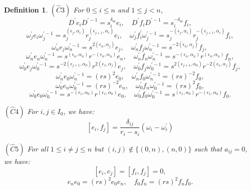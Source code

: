 \documentclass[10pt,a4paper]{amsart}
\newtheorem{defi}[theorem]{Definition}
\numberwithin{equation}{section}
\begin{document}
\begin{defi}
		$(\hat{C} 3)$ For $0 \leqslant i \leqslant n$ and $1 \leqslant j<n$,
			$$
		D^{\prime} e_i D^{\prime-1}=s_i^{\delta_{0 i}} e_i, \quad D^{\prime} f_i D^{\prime-1}=s_i^{-\delta_{0 i}} f_i,
		$$
		$$
		\omega_j^{\prime} e_i \omega_j^{\prime-1}=s_j^{\left(\epsilon_j, \alpha_i\right)} r_j^{\left(\epsilon_{j+1}, \alpha_i\right)} e_i, \quad \omega_j^{\prime} f_i^{\prime} \omega_j^{\prime-1}=s_j^{-\left(\epsilon_j, \alpha_i\right)} r_j^{-\left(\epsilon_{j+1}, \alpha_i\right)} f_i,
		$$
		$$
		\omega_n^{\prime} e_j \omega_n^{\prime-1}=s^{2\left(\epsilon_n, \alpha_j\right)} e_j, \quad \omega_n^{\prime} f_j \omega_n^{\prime-1}=s^{-2\left(\epsilon_n, \alpha_j\right)} f_j \text {, }
		$$
		$$
		\omega_n^{\prime} e_n \omega_n^{\prime-1}=s^{\left(\epsilon_n, \alpha_n\right)} r^{-\left(\epsilon_n, \alpha_n\right)} e_n, \quad \omega_n^{\prime} f_n \omega_n^{\prime-1}=s^{-\left(\epsilon_n, \alpha_n\right)} r^{\left(\epsilon_n, \alpha_n\right)} f_n,
		$$
		$$
		\omega_0^{\prime} e_j \omega_0^{\prime-1}=s^{-2\left(\epsilon_{j+1}, \alpha_0\right)} r^{2\left(\epsilon_1, \alpha_j\right)} e_j, \quad \omega_0^{\prime} f_j \omega_0^{\prime-1}=s^{2\left(\epsilon_{j+1}, \alpha_0\right)} r^{-2\left(\epsilon_1, \alpha_j\right)} f_j,
		$$
		$$
		\omega_n^{\prime} e_0 \omega_n^{\prime-1}=(r s)^2 e_0, \quad \omega_n^{\prime} f_0 \omega_n^{\prime-1}=(r s)^{-2} f_0,
		$$
		$$
		\omega_0^{\prime} e_n \omega_0^{\prime-1}=(r s)^{-2} e_n, \quad \omega_0^{\prime} f_n \omega_0^{\prime-1}=(r s)^2 f_0,
		$$
		$$
		\omega_0^{\prime} e_0 \omega_0^{\prime-1}=s^{-\left(\epsilon_1, \alpha_0\right)} r^{\left(\epsilon_1, \alpha_0\right)} e_0, \quad \omega_0^{\prime} f_0 \omega_0^{\prime-1}=s^{\left(\epsilon_1, \alpha_0\right)} r^{-\left(\epsilon_1, \alpha_0\right)} f_0.
		$$	
		
		$(\hat{C} 4)$ For $i, j \in I_0$, we have:
		$$\left[e_i, f_j\right]=\frac{\delta_{i j}}{r_i-s_i}\left(\omega_i-\omega_i^{\prime}\right)$$
		
		$(\hat{C} 5)$ For all $1 \leqslant i \neq j \leqslant n$ but $(i, j) \notin\{(0, n),(n, 0)\}$ such that $a_{i j}=0$, we have:
$$
\left[e_i, e_j\right]=\left[f_i, f_j\right]=0,
$$
$$
e_n e_0=(r s)^2 e_0 e_n, \quad f_0 f_n=(r s)^2 f_n f_0.
$$


\end{defi}
\end{document}
